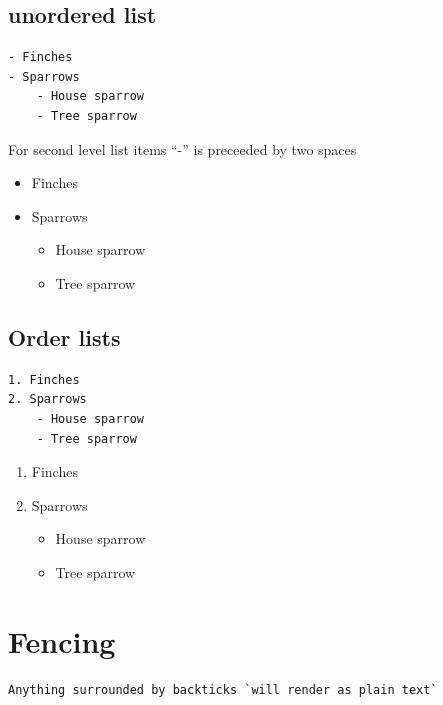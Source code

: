 \documentclass[
]{article}
\providecommand{\tightlist}{%
  \setlength{\itemsep}{0pt}\setlength{\parskip}{0pt}}
\begin{document}
\hypertarget{unordered-list}{%
\subsection{unordered list}\label{unordered-list}}

\begin{verbatim}
- Finches
- Sparrows
    - House sparrow
    - Tree sparrow
\end{verbatim}

For second level list items ``-'' is preceeded by two spaces

\begin{itemize}
\tightlist
\item
  Finches
\item
  Sparrows

  \begin{itemize}
  \tightlist
  \item
    House sparrow
  \item
    Tree sparrow
  \end{itemize}
\end{itemize}

\hypertarget{order-lists}{%
\subsection{Order lists}\label{order-lists}}

\begin{verbatim}
1. Finches
2. Sparrows
    - House sparrow
    - Tree sparrow
\end{verbatim}

\begin{enumerate}
\def\labelenumi{\arabic{enumi}.}
\tightlist
\item
  Finches
\item
  Sparrows

  \begin{itemize}
  \tightlist
  \item
    House sparrow
  \item
    Tree sparrow
  \end{itemize}
\end{enumerate}

\hypertarget{fencing}{%
\section{Fencing}\label{fencing}}

\begin{verbatim}
Anything surrounded by backticks `will render as plain text` 
\end{verbatim}
\end{document}

